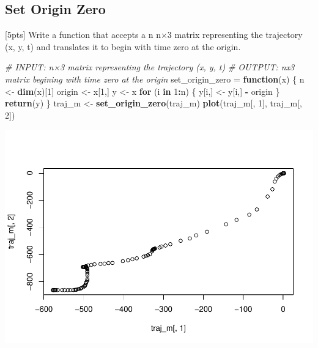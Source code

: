 \documentclass[]{article}
\newenvironment{Shaded}{\begin{snugshade}}{\end{snugshade}}
\newcommand{\CommentTok}[1]{\textcolor[rgb]{0.56,0.35,0.01}{\textit{#1}}}
\newcommand{\ControlFlowTok}[1]{\textcolor[rgb]{0.13,0.29,0.53}{\textbf{#1}}}
\newcommand{\DecValTok}[1]{\textcolor[rgb]{0.00,0.00,0.81}{#1}}
\newcommand{\KeywordTok}[1]{\textcolor[rgb]{0.13,0.29,0.53}{\textbf{#1}}}
\newcommand{\NormalTok}[1]{#1}
\newcommand{\OperatorTok}[1]{\textcolor[rgb]{0.81,0.36,0.00}{\textbf{#1}}}
\newcommand{\StringTok}[1]{\textcolor[rgb]{0.31,0.60,0.02}{#1}}
\begin{document}
\hypertarget{set-origin-zero}{%
\subsection{Set Origin Zero}\label{set-origin-zero}}

{[}5pts{]} Write a function that accepts a n n×3 matrix representing the
trajectory (x, y, t) and translates it to begin with time zero at the
origin.

\begin{Shaded}
\begin{Highlighting}[]
\CommentTok{# INPUT: n×3 matrix representing the trajectory (x, y, t)}
\CommentTok{# OUTPUT: nx3 matrix begining with time zero at the origin}
\NormalTok{set_origin_zero =}\StringTok{ }\ControlFlowTok{function}\NormalTok{(x) \{}
\NormalTok{  n <-}\StringTok{ }\KeywordTok{dim}\NormalTok{(x)[}\DecValTok{1}\NormalTok{]}
\NormalTok{  origin <-}\StringTok{ }\NormalTok{x[}\DecValTok{1}\NormalTok{,]}
\NormalTok{  y <-}\StringTok{ }\NormalTok{x}
  \ControlFlowTok{for}\NormalTok{ (i }\ControlFlowTok{in} \DecValTok{1}\OperatorTok{:}\NormalTok{n) \{}
\NormalTok{    y[i,] <-}\StringTok{ }\NormalTok{y[i,] }\OperatorTok{-}\StringTok{ }\NormalTok{origin}
\NormalTok{  \}}
  \KeywordTok{return}\NormalTok{(y)}
\NormalTok{\}}
\NormalTok{traj_m <-}\StringTok{ }\KeywordTok{set_origin_zero}\NormalTok{(traj_m)}
\KeywordTok{plot}\NormalTok{(traj_m[, }\DecValTok{1}\NormalTok{], traj_m[, }\DecValTok{2}\NormalTok{])}
\end{Highlighting}
\end{Shaded}

\includegraphics{ps1_q3_files/figure-latex/unnamed-chunk-2-1.pdf}
\end{document}
